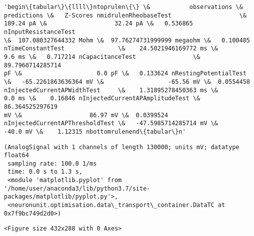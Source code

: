             \begin{tcolorbox}[breakable, size=fbox, boxrule=.5pt, pad at break*=1mm, opacityfill=0]
\begin{Verbatim}[commandchars=\\\{\}]
'begin\{tabular\}\{llll\}ntoprulen\{\} \&           observations \&
predictions \&   Z-Scores nmidrulenRheobaseTest                   \&
189.24 pA \&                   32.24 pA \&   0.536865 nInputResistanceTest
\&  107.080327644332 Mohm \&  97.76274731999999 megaohm \&   0.100485
nTimeConstantTest               \&    24.5021946169772 ms \&
9.6 ms \&   0.717214 nCapacitanceTest                \&    89.7960714285714
pF \&                     0.0 pF \&   0.133624 nRestingPotentialTest
\&   -65.2261863636364 mV \&                  -65.56 mV \&  0.0554458
nInjectedCurrentAPWidthTest     \&    1.31895278450363 ms \&
0.0 ms \&    0.16846 nInjectedCurrentAPAmplitudeTest \&     86.364525297619
mV \&                   86.97 mV \&  0.0399524
nInjectedCurrentAPThresholdTest \&   -47.5985714285714 mV \&
-40.0 mV \&    1.12315 nbottomrulenend\{tabular\}n'
\end{Verbatim}
\end{tcolorbox}
        
            \begin{tcolorbox}[breakable, size=fbox, boxrule=.5pt, pad at break*=1mm, opacityfill=0]
\begin{Verbatim}[commandchars=\\\{\}]
(AnalogSignal with 1 channels of length 130000; units mV; datatype float64
 sampling rate: 100.0 1/ms
 time: 0.0 s to 1.3 s,
 <module 'matplotlib.pyplot' from '/home/user/anaconda3/lib/python3.7/site-
packages/matplotlib/pyplot.py'>,
 <neuronunit.optimisation.data\_transport\_container.DataTC at 0x7f9bc749d2d0>)
\end{Verbatim}
\end{tcolorbox}
        
    
    \begin{verbatim}
<Figure size 432x288 with 0 Axes>
    \end{verbatim}

    
    \begin{center}
    \end{center}
    { \hspace*{\fill} \\}
    
